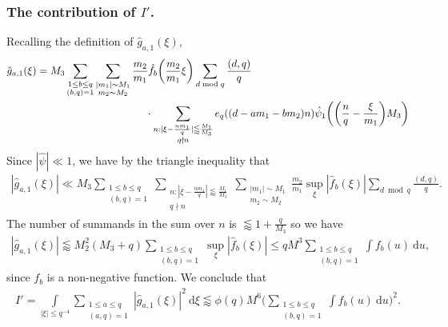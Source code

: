 \documentclass[12pt]{amsart}
\theoremstyle{definition}
\theoremstyle{plain}
\theoremstyle{remark}
\numberwithin{equation}{section}
\numberwithin{theorem}{section}
\numberwithin{equation}{section}
\begin{document}
	\subsubsection{The contribution of $I'$.}\label{affTcI'}
	
	Recalling the definition of $\hat{g}_{a,1}(\xi)$,
	\begin{align*}
		\hat{g}_{a,1}(\xi)= M_{3}\sum_{\substack{1 \leq b \leq q \\ (b, q)=1}}&\sum_{\substack{|m_{1}|\sim M_{1} \\ m_{2}\sim M_{2}}}\frac{m_{2}}{m_{1}}\hat{f}_{b}\bigg(\frac{m_{2}}{m_{1}}\xi\bigg)\sum_{d \bmod q}\frac{(d, q)}{q}
		\notag
		\\
		&\quad\quad\quad\quad\quad\cdot \sum_{\substack{n: |\xi - \frac{nm_{1}}{q}|\lessapprox \frac{M_{1}}{M_{3}} \\ q\nmid n }}e_q({(d-am_{1}-bm_{2})}n)\hat{\psi}_{1}\bigg(\bigg(\frac{n}{q}-\frac{\xi}{m_{1}}\bigg)M_{3}\bigg)
	\end{align*}
	Since $|\hat{\psi}| \ll 1$, we have by the triangle inequality that
	\begin{align*}
		|\hat{g}_{a,1}(\xi)| \ll  M_3 \sum_{\substack{1 \leq b \leq q \\ (b,q)=1}} \sum_{\substack{n: |\xi - \frac{nm_{1}}{q}|\lessapprox \frac{M_{1}}{M_{3}} \\ q\nmid n }} \sum_{\substack{|m_1| \sim M_1 \\ m_2 \sim M_2}} \frac{m_2}{m_1} \sup_{\xi} |\hat{f}_b(\xi)| \sum_{d \bmod q} \frac{(d,q)}{q}.
	\end{align*}
	The number of summands in the sum over $n$ is $\lessapprox 1+ \frac{q}{M_3}$ so we have 
	\begin{align*}
		|\hat{g}_{a,1}(\xi)| \lessapprox M_2^2(M_3+q) \sum_{\substack{1 \leq b \leq q \\ (b,q)=1}}  \sup_{\xi} |\hat{f}_b(\xi)|\leq qM^3 \sum_{\substack{1 \leq b \leq q \\(b,q)=1}}\int f_b(u)  \: \mathrm{d} u,
	\end{align*}
	since $f_b$ is a non-negative function. We conclude that
	\begin{align}\label{conI'}
		I'= \int\limits_{|\xi|\leq q^{-4}}\sum_{\substack{1 \leq a \leq q \\ (a, q)=1}}|\hat{g}_{a,1}(\xi)|^{2}\: \mathrm{d} \xi  \lessapprox \phi(q)M^{6}\bigg(\sum_{\substack{1 \leq b \leq q \\ (b, q)=1}}\int f_{b}(u)\:\mathrm{d}u\bigg)^{2}.
	\end{align}
\end{document}
